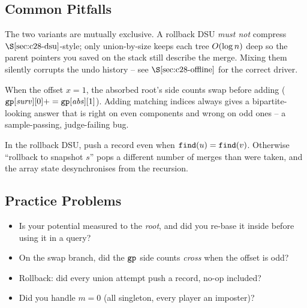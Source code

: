 \subsection{Common Pitfalls}

\begin{warningbox}
The two variants are mutually exclusive.  A rollback DSU \emph{must not}
compress \(\secref{c28-dsu}\)-style; only union-by-size keeps each tree
\(O(\log n)\) deep so the parent pointers you saved on the stack still
describe the merge.  Mixing them silently corrupts the undo history -- see
\(\secref{c28-offline}\) for the correct driver.
\end{warningbox}

\begin{warningbox}
When the offset \(x=1\), the absorbed root's side counts swap before adding
(\(\texttt{gp}[\mathit{surv}][0]+=\texttt{gp}[\mathit{abs}][1]\)).  Adding
matching indices always gives a bipartite-looking answer that is right on
even components and wrong on odd ones -- a sample-passing, judge-failing bug.
\end{warningbox}

\begin{warningbox}
In the rollback DSU, push a record even when \(\texttt{find}(u)=\texttt{find}(v)\).
Otherwise ``rollback to snapshot \(s\)'' pops a different number of merges
than were taken, and the array state desynchronises from the recursion.
\end{warningbox}

\subsection{Practice Problems}

\begin{stuckbox}
\begin{itemize}[nosep, leftmargin=1.4em]
  \item Is your potential measured to the \emph{root}, and did you re-base it
        inside  before using it in a query?
  \item On the swap branch, did the \(\texttt{gp}\) side counts \emph{cross}
        when the offset is odd?
  \item Rollback: did every union attempt push a record, no-op included?
  \item Did you handle \(m=0\) (all singleton, every player an imposter)?
\end{itemize}
\end{stuckbox}

